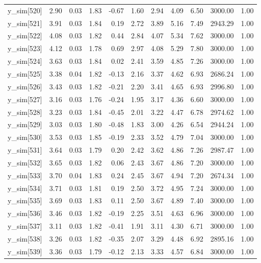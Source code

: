 \begin{table}[ht]
\begin{tabular}{rrrrrrrrrrr}
  y\_sim[520] & 2.90 & 0.03 & 1.83 & -0.67 & 1.60 & 2.94 & 4.09 & 6.50 & 3000.00 & 1.00 \\ 
  y\_sim[521] & 3.91 & 0.03 & 1.84 & 0.19 & 2.72 & 3.89 & 5.16 & 7.49 & 2943.29 & 1.00 \\ 
  y\_sim[522] & 4.08 & 0.03 & 1.82 & 0.44 & 2.84 & 4.07 & 5.34 & 7.62 & 3000.00 & 1.00 \\ 
  y\_sim[523] & 4.12 & 0.03 & 1.78 & 0.69 & 2.97 & 4.08 & 5.29 & 7.80 & 3000.00 & 1.00 \\ 
  y\_sim[524] & 3.63 & 0.03 & 1.84 & 0.02 & 2.41 & 3.59 & 4.85 & 7.26 & 3000.00 & 1.00 \\ 
  y\_sim[525] & 3.38 & 0.04 & 1.82 & -0.13 & 2.16 & 3.37 & 4.62 & 6.93 & 2686.24 & 1.00 \\ 
  y\_sim[526] & 3.43 & 0.03 & 1.82 & -0.21 & 2.20 & 3.41 & 4.65 & 6.93 & 2996.80 & 1.00 \\ 
  y\_sim[527] & 3.16 & 0.03 & 1.76 & -0.24 & 1.95 & 3.17 & 4.36 & 6.60 & 3000.00 & 1.00 \\ 
  y\_sim[528] & 3.23 & 0.03 & 1.84 & -0.45 & 2.01 & 3.22 & 4.47 & 6.78 & 2974.62 & 1.00 \\ 
  y\_sim[529] & 3.03 & 0.03 & 1.80 & -0.48 & 1.83 & 3.00 & 4.26 & 6.54 & 2944.24 & 1.00 \\ 
  y\_sim[530] & 3.53 & 0.03 & 1.85 & -0.19 & 2.33 & 3.52 & 4.79 & 7.04 & 3000.00 & 1.00 \\ 
  y\_sim[531] & 3.64 & 0.03 & 1.79 & 0.20 & 2.42 & 3.62 & 4.86 & 7.26 & 2987.47 & 1.00 \\ 
  y\_sim[532] & 3.65 & 0.03 & 1.82 & 0.06 & 2.43 & 3.67 & 4.86 & 7.20 & 3000.00 & 1.00 \\ 
  y\_sim[533] & 3.70 & 0.04 & 1.83 & 0.24 & 2.45 & 3.67 & 4.94 & 7.20 & 2674.34 & 1.00 \\ 
  y\_sim[534] & 3.71 & 0.03 & 1.81 & 0.19 & 2.50 & 3.72 & 4.95 & 7.24 & 3000.00 & 1.00 \\ 
  y\_sim[535] & 3.69 & 0.03 & 1.83 & 0.11 & 2.50 & 3.67 & 4.89 & 7.40 & 3000.00 & 1.00 \\ 
  y\_sim[536] & 3.46 & 0.03 & 1.82 & -0.19 & 2.25 & 3.51 & 4.63 & 6.96 & 3000.00 & 1.00 \\ 
  y\_sim[537] & 3.11 & 0.03 & 1.82 & -0.41 & 1.91 & 3.11 & 4.30 & 6.71 & 3000.00 & 1.00 \\ 
  y\_sim[538] & 3.26 & 0.03 & 1.82 & -0.35 & 2.07 & 3.29 & 4.48 & 6.92 & 2895.16 & 1.00 \\ 
  y\_sim[539] & 3.36 & 0.03 & 1.79 & -0.12 & 2.13 & 3.33 & 4.57 & 6.84 & 3000.00 & 1.00 \\ 

\end{tabular}
\end{table}

